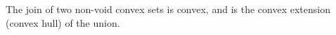 The join of two non-void convex sets is convex, and is the convex extension (convex hull) of the union.
